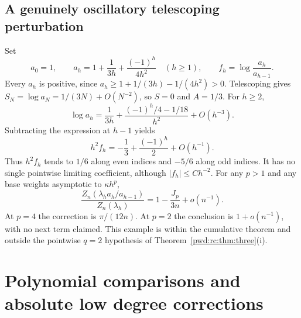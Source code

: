 \documentclass[11pt,letterpaper]{article}
\numberwithin{equation}{section}
\theoremstyle{remark}\newtheorem{remark}[theorem]{Remark}
\begin{document}
\subsection{A genuinely oscillatory telescoping perturbation}\label{pwd:rc:sec:oscillatory}
Set
\begin{equation}\label{pwd:rc:eq:oscillatory}
 a_0=1,\qquad a_h=1+\frac1{3h}+\frac{(-1)^h}{4h^2}\quad(h\ge1),\qquad
 f_h=\log\frac{a_h}{a_{h-1}}.
\end{equation}
Every $a_h$ is positive, since $a_h\ge1+1/(3h)-1/(4h^2)>0$. Telescoping gives $S_N=\log a_N=1/(3N)+O(N^{-2})$, so $S=0$ and $A=1/3$. For $h\ge2$,
\[
 \log a_h=\frac1{3h}+\frac{(-1)^h/4-1/18}{h^2}+O(h^{-3}).
\]
Subtracting the expression at $h-1$ yields
\begin{equation}\label{pwd:rc:eq:osc-limits}
 h^2f_h=-\frac13+\frac{(-1)^h}{2}+O(h^{-1}).
\end{equation}
Thus $h^2f_h$ tends to $1/6$ along even indices and $-5/6$ along odd indices. It has no single pointwise limiting coefficient, although $|f_h|\le Ch^{-2}$. For any $p>1$ and any base weights asymptotic to $\kappa h^p$,
\[
 \frac{Z_n(\lambda_h a_h/a_{h-1})}{Z_n(\lambda_h)}
 =1-\frac{J_p}{3n}+o(n^{-1}).
\]
At $p=4$ the correction is $\pi/(12n)$. At $p=2$ the conclusion is $1+o(n^{-1})$, with no next term claimed. This example is within the cumulative theorem and outside the pointwise $q=2$ hypothesis of Theorem~\ref{pwd:rc:thm:three}(i).

\section{Polynomial comparisons and absolute low degree corrections}\label{pwd:rc:sec:polynomials}
\end{document}
